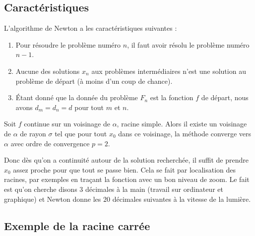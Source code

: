 \subsection{Caractéristiques}

L'algorithme de Newton a les caractéristiques suivantes :
\begin{enumerate}

	\item
		Pour résoudre le problème numéro $n$, il faut avoir résolu le problème numéro $n-1$.
	\item
		Aucune des solutions $x_n$ aux problèmes intermédiaires n'est une solution au problème de départ (à moins d'un coup de chance).
	\item
		Étant donné que la donnée du problème $F_n$ est la fonction $f$ de départ, nous avons $d_m=d_n=d$ pour tout $m$ et $n$.
\end{enumerate}

\begin{theorem}     \label{THOooMACHooLofCVu}
    Soit \( f\) continue sur un voisinage de \( \alpha\), racine simple. Alors il existe un voisinage de \( \alpha\) de rayon \( \sigma\) tel que pour tout \( x_0\) dans ce voisinage, la méthode converge vers \( \alpha\) avec ordre de convergence \( p=2\).
\end{theorem}

Donc dès qu'on a continuité autour de la solution recherchée, il suffit de prendre \( x_0\) assez proche pour que tout se passe bien. Cela se fait par localisation des racines, par exemples en traçant la fonction avec un bon niveau de zoom. Le fait est qu'on cherche disons \( 3\) décimales à la main (travail sur ordinateur et graphique) et Newton donne les \( 20\) décimales suivantes à la vitesse de la lumière.

\subsection{Exemple de la racine carrée}


